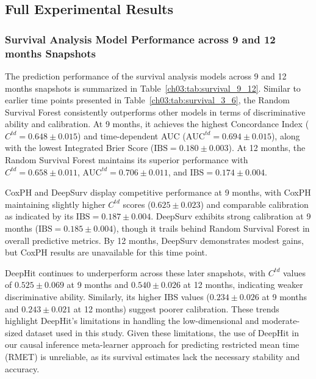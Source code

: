 \subsection{Full Experimental Results}\ChThreeHeadingOnly
\label{ch03:apd:full_results}




\subsubsection{Survival Analysis Model Performance across 9 and 12 months Snapshots}
\label{ch03:apd:survival_analysis}

The prediction performance of the survival analysis models across 9 and 12 months snapshots is summarized in Table~\ref{ch03:tab:survival_9_12}.
Similar to earlier time points presented in Table~\ref{ch03:tab:survival_3_6}, the Random Survival Forest consistently outperforms other models in terms of discriminative ability and calibration.
At 9 months, it achieves the highest Concordance Index (\(C^{td} = 0.648 \pm 0.015\)) and time-dependent AUC (\(\text{AUC}^{td} = 0.694 \pm 0.015\)), along with the lowest Integrated Brier Score (\(\text{IBS} = 0.180 \pm 0.003\)).
At 12 months, the Random Survival Forest maintains its superior performance with \(C^{td} = 0.658 \pm 0.011\), \(\text{AUC}^{td} = 0.706 \pm 0.011\), and \(\text{IBS} = 0.174 \pm 0.004\).

CoxPH and DeepSurv display competitive performance at 9 months, with CoxPH maintaining slightly higher \(C^{td}\) scores (\(0.625 \pm 0.023\)) and comparable calibration as indicated by its \(\text{IBS} = 0.187 \pm 0.004\).
DeepSurv exhibits strong calibration at 9 months (\(\text{IBS} = 0.185 \pm 0.004\)), though it trails behind Random Survival Forest in overall predictive metrics.
By 12 months, DeepSurv demonstrates modest gains, but CoxPH results are unavailable for this time point.

DeepHit continues to underperform across these later snapshots, with \(C^{td}\) values of \(0.525 \pm 0.069\) at 9 months and \(0.540 \pm 0.026\) at 12 months, indicating weaker discriminative ability.
Similarly, its higher \(\text{IBS}\) values (\(0.234 \pm 0.026\) at 9 months and \(0.243 \pm 0.021\) at 12 months) suggest poorer calibration.
These trends highlight DeepHit's limitations in handling the low-dimensional and moderate-sized dataset used in this study.
Given these limitations, the use of DeepHit in our causal inference meta-learner approach for predicting restricted mean time (RMET) is unreliable, as its survival estimates lack the necessary stability and accuracy.


